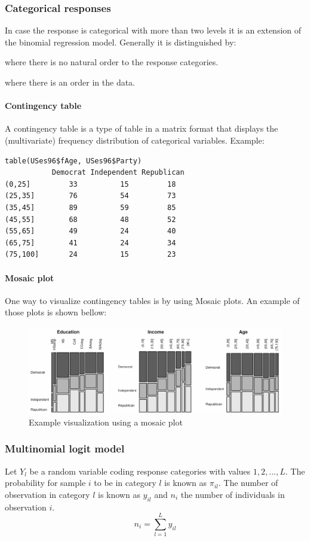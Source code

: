 \subsubsection{Categorical responses}
In case the response is categorical with more than two levels it is an extension of the binomial regression model. Generally it is distinguished by:
\begin{description}
	\tightlist
	\item[Nominal data] where there is no natural order to the response	categories.
	\item[Ordinal data] where there is an order in the data.
\end{description}

\paragraph{Contingency table}
A contingency table is a type of table in a matrix format that displays the (multivariate) frequency distribution of categorical variables. Example:
\begin{lstlisting}
table(USes96$fAge, USes96$Party)
           Democrat Independent Republican
(0,25]         33          15         18
(25,35]        76          54         73
(35,45]        89          59         85
(45,55]        68          48         52
(55,65]        49          24         40
(65,75]        41          24         34
(75,100]       24          15         23
\end{lstlisting}

\paragraph{Mosaic plot}
One way to visualize contingency tables is by using Mosaic plots. An example of those plots is shown bellow:
\begin{figure}[H]
	\centering
	\includegraphics[width=.8\textwidth]{images/example-mosaic.png}
	\caption{Example visualization using a mosaic plot}
\end{figure}

\subsubsection{Multinomial logit model}
Let $Y_l$ be a random variable coding response categories with values $1, 2, ..., L$. The probability for sample $i$ to be in category $l$ is known as $\pi_{il}$. The number of observation in category $l$ is known as $y_{il}$ and $n_i$ the number of individuals in observation $i$.
\begin{equation*}
n_i = \sum_{l=1}^{L}y_{il}
\end{equation*}

